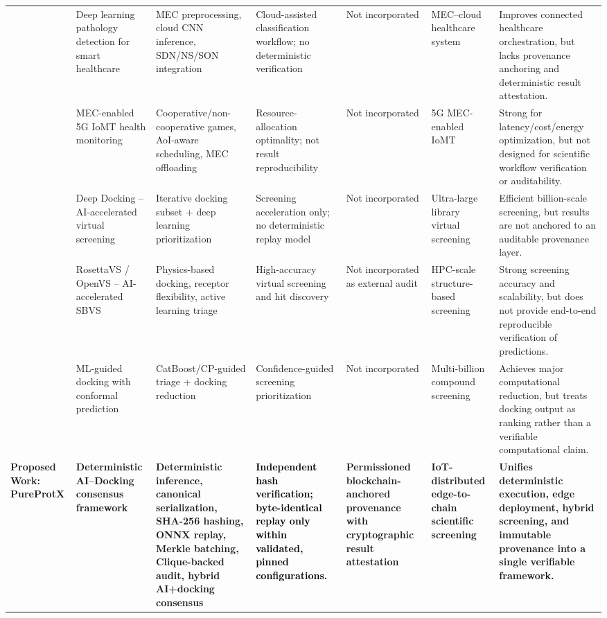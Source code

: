 \documentclass[conference]{IEEEtran}
\newcommand{\rev}[2]{#2}
\begin{document}
\begin{table}[!htbp]
{\begin{tabular}{p{1.5cm} p{3.5cm} p{3.5cm} p{2.4cm} p{2.9cm} p{2.9cm} p{3.8cm}}
\cite{hossain2020deep} & Deep learning pathology detection for smart healthcare & MEC preprocessing, cloud CNN inference, SDN/NS/SON integration & Cloud-assisted classification workflow; no deterministic verification & Not incorporated & MEC--cloud healthcare system & Improves connected healthcare orchestration, but lacks provenance anchoring and deterministic result attestation. \\

\cite{ning2020mobile} & MEC-enabled 5G IoMT health monitoring & Cooperative/non-cooperative games, AoI-aware scheduling, MEC offloading & Resource-allocation optimality; not result reproducibility & Not incorporated & 5G MEC-enabled IoMT & Strong for latency/cost/energy optimization, but not designed for scientific workflow verification or auditability. \\

\cite{gentile2022artificial} & Deep Docking -- AI-accelerated virtual screening & Iterative docking subset + deep learning prioritization & Screening acceleration only; no deterministic replay model & Not incorporated & Ultra-large library virtual screening & Efficient billion-scale screening, but results are not anchored to an auditable provenance layer. \\

\cite{zhou2024artificial} & RosettaVS / OpenVS -- AI-accelerated SBVS & Physics-based docking, receptor flexibility, active learning triage & High-accuracy virtual screening and hit discovery & Not incorporated as external audit & HPC-scale structure-based screening & Strong screening accuracy and scalability, but does not provide end-to-end reproducible verification of predictions. \\

\cite{luttens2025rapid} & ML-guided docking with conformal prediction & CatBoost/CP-guided triage + docking reduction & Confidence-guided screening prioritization & Not incorporated & Multi-billion compound screening & Achieves major computational reduction, but treats docking output as ranking rather than a verifiable computational claim. \\

\textbf{Proposed Work: PureProtX} & \textbf{Deterministic AI--Docking consensus framework} & \textbf{Deterministic inference, canonical serialization, SHA-256 hashing, ONNX replay, Merkle batching, \rev{R2.4}{Clique-backed audit}, hybrid AI+docking consensus} & \textbf{\textcolor{black}{\rev{R1.1}{Independent hash verification; byte-identical replay only within validated, pinned configurations.}}} & \textbf{Permissioned blockchain-anchored provenance with cryptographic result attestation} & \textbf{IoT-distributed edge-to-chain scientific screening} & \textbf{Unifies deterministic execution, edge deployment, hybrid screening, and immutable provenance into a single verifiable framework.} \\

\hline
\end{tabular}
}
\end{table}
\end{document}
